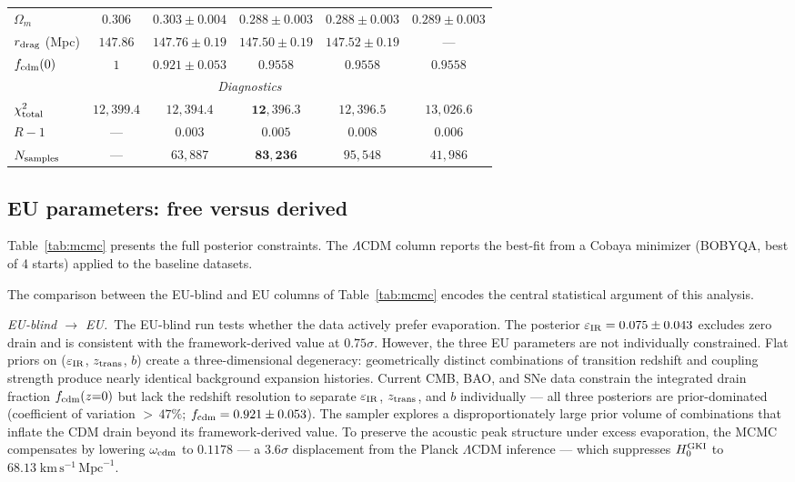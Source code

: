 \documentclass[a4paper,fleqn]{cas-dc}
\begin{document}
\begin{table}[t]
\begin{tabular}{lccccc}
$\Omega_m$
  & $0.306$ & $0.303 \pm 0.004$
  & $\mathbf{0.288 \pm 0.003}$ & $0.288 \pm 0.003$
  & $0.289 \pm 0.003$ \\
$r_{\rm drag}$ (Mpc)
  & $147.86$ & $147.76 \pm 0.19$
  & $\mathbf{147.50 \pm 0.19}$ & $147.52 \pm 0.19$
  & --- \\
$f_{\rm cdm}(0)$
  & $1$ & $0.921 \pm 0.053$
  & $\mathbf{0.9558}$ & $0.9558$
  & $0.9558$ \\[4pt]
\hline
\multicolumn{6}{c}{\textit{Diagnostics}} \\
$\chi^2_{\rm total}$
  & $12{,}399.4$ & $12{,}394.4$
  & $\mathbf{12{,}396.3}$ & $12{,}396.5$
  & $13{,}026.6$ \\
$R-1$
  & --- & $0.003$ & $\mathbf{0.005}$ & $0.008$ & $0.006$ \\
$N_{\rm samples}$
  & --- & $63{,}887$ & $\mathbf{83{,}236}$ & $95{,}548$
  & $41{,}986$ \\
\end{tabular}
\end{table}

\subsection{EU parameters: free versus derived}
\label{sec:posteriors}

Table~\ref{tab:mcmc} presents the full posterior constraints.
The $\Lambda$CDM column reports the best-fit from a Cobaya
minimizer (BOBYQA, best of 4 starts) applied to the baseline
datasets.


The comparison between the EU-blind and EU columns of
Table~\ref{tab:mcmc} encodes the central statistical argument
of this analysis.

\textit{EU-blind $\to$ EU.}~The EU-blind run tests whether the data actively prefer evaporation.
The posterior $\varepsilon_{\rm IR} = 0.075 \pm 0.043$
excludes zero drain and is consistent with the
framework-derived value at $0.75\sigma$. However, the three
EU parameters are not individually constrained. Flat priors
on ($\varepsilon_{\rm IR}$, $z_{\rm trans}$, $b$) create a
three-dimensional degeneracy: geometrically distinct
combinations of transition redshift and coupling strength
produce nearly identical background expansion histories.
Current CMB, BAO, and SNe data constrain the integrated
drain fraction $f_{\rm cdm}(z{=}0)$ but lack the redshift
resolution to separate $\varepsilon_{\rm IR}$,
$z_{\rm trans}$, and $b$ individually --- all three
posteriors are prior-dominated (coefficient of variation
${>}\,47\%$; $f_{\rm cdm} = 0.921 \pm 0.053$).
The sampler explores a disproportionately large prior
volume of combinations that inflate the CDM drain beyond
its framework-derived value.
To preserve the acoustic peak structure under excess
evaporation, the MCMC compensates by lowering
$\omega_{\rm cdm}$ to $0.1178$ --- a $3.6\sigma$
displacement from the Planck $\Lambda$CDM inference ---
which suppresses $H_0^{\rm GKI}$ to
$68.13\;\text{km}\,\text{s}^{-1}\,\text{Mpc}^{-1}$.
\end{document}
